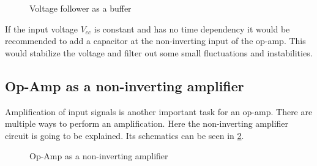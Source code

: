 \begin{figure}[htb]
	\centering
	\caption{Voltage follower as a buffer}
	\label{fig:attenuator-buffer}
\end{figure}

If the input voltage $V_{cc}$ is constant and has no time dependency it would be recommended to add a capacitor at the non-inverting input of the op-amp. This would stabilize the voltage and filter out some small fluctuations and instabilities.

\subsection{Op-Amp as a non-inverting amplifier}

Amplification of input signals is another important task for an op-amp. There are multiple ways to perform an amplification. Here the non-inverting amplifier circuit is going to be explained. Its schematics can be seen in \cref{fig:non_inverting_amplifier}.

\begin{figure}[htb]
	\centering
	\caption{Op-Amp as a non-inverting amplifier}
	\label{fig:non_inverting_amplifier}
\end{figure}

